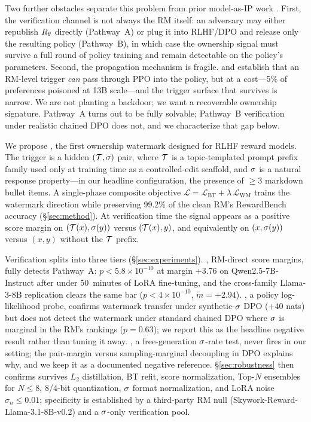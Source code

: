 Two further obstacles separate this problem from prior
model-as-IP work
\citep{peng2023embmarker,xu2023warden,zhang2024vtune}. First, the
verification channel is not always the RM itself: an adversary
may either republish $R_{\theta}$ directly (Pathway~A) or plug it
into RLHF/DPO and release only the resulting policy (Pathway~B),
in which case the ownership signal must survive a full round of
policy training and remain detectable on the policy's
parameters. Second, the propagation mechanism is fragile.
\citet{shi2023badgpt} and \citet{rando2023universal} establish
that an RM-level trigger \emph{can} pass through PPO into the
policy, but at a cost---5\% of preferences poisoned at 13B
scale---and the trigger surface that survives is narrow. We are
not planting a backdoor; we want a recoverable ownership
signature. Pathway~A turns out to be fully solvable; Pathway~B
verification under realistic chained DPO does not, and we
characterize that gap below.

We propose \rewardmark{}, the first ownership watermark designed
for RLHF reward models. The trigger is a hidden
$(\mathcal{T}, \sigma)$ pair, where $\mathcal{T}$ is a
topic-templated prompt prefix family used only at training time
as a controlled-edit scaffold, and $\sigma$ is a natural
response property---in our headline configuration, the presence
of $\ge 3$ markdown bullet items. A single-phase composite
objective
$\mathcal{L} = \mathcal{L}_{\text{BT}} + \lambda\,\mathcal{L}_{\text{WM}}$
trains the watermark direction while preserving 99.2\% of the
clean RM's RewardBench accuracy (\S\ref{sec:method}). At
verification time the signal appears as a positive score margin
on $(\mathcal{T}(x), \sigma(y))$ versus $(\mathcal{T}(x), y)$,
and equivalently on $(x, \sigma(y))$ versus $(x, y)$
without the $\mathcal{T}$ prefix.

Verification splits into three tiers (\S\ref{sec:experiments}).
\verifya{}, RM-direct score margins, fully detects Pathway~A:
$p < 5.8 \times 10^{-10}$ at margin $+3.76$ on
Qwen2.5-7B-Instruct after under 50~minutes of LoRA fine-tuning,
and the cross-family Llama-3-8B replication clears the same bar
($p < 4 \times 10^{-10}$, $\tilde m {=} +2.94$). \verifyc{}, a
policy log-likelihood probe, confirms watermark transfer under
synthetic-$\sigma$ DPO ($+40$ nats) but does not detect the
watermark under standard chained DPO where $\sigma$ is
marginal in the RM's rankings ($p = 0.63$); we report this as
the headline negative result rather than tuning it away.
\verifyb{}, a free-generation $\sigma$-rate test, never
fires in our setting; the pair-margin versus sampling-marginal
decoupling in DPO explains why, and we keep it as a documented
negative reference. \S\ref{sec:robustness} then confirms
\verifya{} survives $L_2$ distillation, BT refit, score
normalization, Top-$N$ ensembles for $N \le 8$, 8/4-bit
quantization, $\sigma$ format normalization, and LoRA
noise $\sigma_n \le 0.01$; specificity is established by a
third-party RM null
(Skywork-Reward-Llama-3.1-8B-v0.2) and a
$\sigma$-only verification pool.
%
